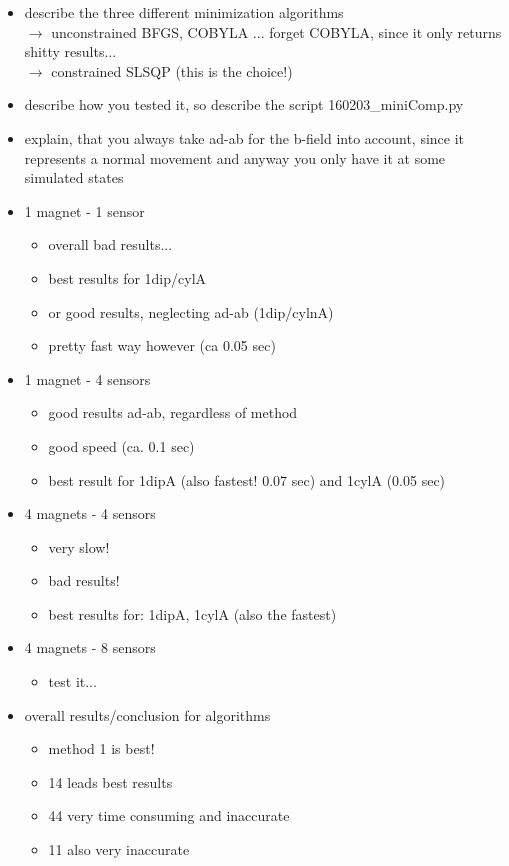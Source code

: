 \begin{itemize}

\item describe the three different minimization algorithms \\
	$ \rightarrow $ unconstrained BFGS, COBYLA ... forget COBYLA, since it only returns shitty results...\\
	$ \rightarrow $ constrained SLSQP (this is the choice!)
	
\item describe how you tested it, so describe the script 160203\_miniComp.py
\item explain, that you always take ad-ab for the b-field into account, since it represents a normal movement and anyway you only have it at some simulated states

\item 1 magnet - 1 sensor
	\begin{itemize}
	\item overall bad results...
	\item best results for 1dip/cylA
	\item or good results, neglecting ad-ab (1dip/cylnA)
	\item pretty fast way however (ca 0.05 sec)
	\end{itemize}
\item 1 magnet - 4 sensors
	\begin{itemize}
	\item good results ad-ab, regardless of method	
	\item good speed (ca. 0.1 sec)
	\item best result for 1dipA (also fastest! 0.07 sec) and 1cylA (0.05 sec)
	\end{itemize}
\item 4 magnets - 4 sensors
	\begin{itemize}
	\item very slow! 
	\item bad results!
	\item best results for: 1dipA, 1cylA (also the fastest)
	\end{itemize}
	
\item 4 magnets - 8 sensors
	\begin{itemize}
	\item test it...
	\end{itemize}	
	
\item overall results/conclusion for algorithms
	\begin{itemize}
	\item method 1 is best!
	\item 14 leads best results
	\item 44 very time consuming and inaccurate
	\item 11 also very inaccurate
	\end{itemize}	
		

\end{itemize}
